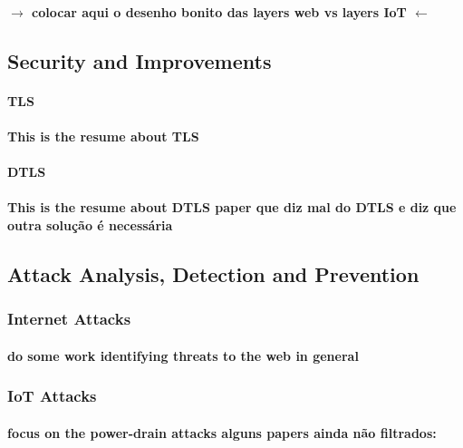 \paragraph{
	$\rightarrow$ colocar aqui o desenho bonito das layers web vs layers IoT $\leftarrow$
}

\subsection{Security and Improvements}

\paragraph{\textbf{\ac{TLS}}}
\paragraph{
	This is the resume about TLS
}

\paragraph{\textbf{\ac{DTLS}}}
\paragraph{
	This is the resume about DTLS
	paper que diz mal do \ac{DTLS} \cite{Alghamdi2013} e diz que outra solução é necessária
}

\subsection{Attack Analysis, Detection and Prevention}

\subsubsection{Internet Attacks}
\paragraph{
do some work identifying threats to the web in general
}
\subsubsection{IoT Attacks}
\paragraph{
	focus on the power-drain attacks
	alguns papers ainda não filtrados: \cite{Vasserman2013,Vanitha2014}
}
